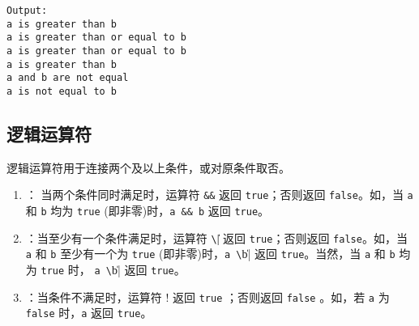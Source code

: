 \begin{frame}\ft{\subsecname}

  
\end{frame}


\begin{frame}[fragile]\ft{\subsecname}
\begin{lstlisting}[backgroundcolor=\color{red!10}]
Output:
a is greater than b
a is greater than or equal to b
a is greater than or equal to b
a is greater than b
a and b are not equal
a is not equal to b  
\end{lstlisting}  
\end{frame}


\subsection{逻辑运算符}
\begin{frame}
  逻辑运算符用于连接两个及以上条件，或对原条件取否。
\begin{enumerate}
\item
  ： 当两个条件同时满足时，运算符  \lstinline|&&| 返回 \lstinline|true|；否则返回  \lstinline|false|。如，当 \lstinline|a| 和 \lstinline|b| 均为  \lstinline|true| (即非零)时，\lstinline|a && b| 返回 \lstinline|true|。
\item
  ：当至少有一个条件满足时，运算符  \lstinline|\|\|| 返回 \lstinline|true|；否则返回  \lstinline|false|。如，当 \lstinline|a| 和 \lstinline|b| 至少有一个为  \lstinline|true| (即非零)时，\lstinline|a \|\| b| 返回 \lstinline|true|。当然，当 \lstinline|a| 和 \lstinline|b| 均为  \lstinline|true| 时， \lstinline|a \|\| b| 返回 \lstinline|true|。
\item
  ：当条件不满足时，运算符 {\tf !} 返回  \lstinline|true| ；否则返回  \lstinline|false| 。如，若 \lstinline|a| 为  \lstinline|false| 时，\lstinline|a| 返回  \lstinline|true|。
\end{enumerate}
  
\end{frame}

\begin{frame}\ft{\subsecname}

  
\end{frame}


